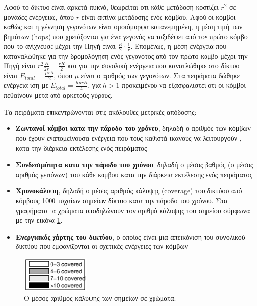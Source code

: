 Αφού το δίκτυο είναι αρκετά πυκνό, θεωρείται οτι κάθε μετάδοση κοστίζει $r^{2}$ σε μονάδες ενέργειας, όπου $r$ είναι ακτίνα μετάδοσης ενός κόμβου. Αφού οι κόμβοι
καθώς και η γέννηση γεγονότων είναι ομοιόμορφα κατανεμημένη, η μέση τιμή των βημάτων (hops) που χρειάζονται για ένα γεγονός να ταξιδέψει από τον πρώτο κόμβο που το
ανίχνευσε μέχρι την Πηγή είναι $\frac{R}{2}\cdot \frac{1}{r}$. Επομένως, η μέση ενέργεια που καταναλώθηκε για την δρομολόγηση ενός γεγονότος από τον πρώτο κόμβο μέχρι
την Πηγή είναι $r^2\frac{R}{2r} = \frac{rR}{2}$ και για την συνολική ενέργεια που κανατλώθηκε στο δίκτυο είναι $E_{total} = \frac{\mu r R}{2}$, όπου $\mu$ είναι ο
αριθμός των γεγονότων. Στα πειράματα δώθηκε ενέργεια ίση με $E_{total} = \frac{h\mu r R}{4}$, για $h > 1$ προκειμένου να εξασφαλιστεί οτι οι κόμβοι πεθαίνουν μετά
από αρκετούς γύρους.

Τα πειράματα επικεντρώνονται στις ακόλουθες μετρικές απόδοσης:
\begin{itemize}
\item \textbf{Ζωντανοί κόμβοι κατα την πάροδο του χρόνου}, δηλαδή ο αριθμός των κόμβων που έχουν εναπομείνουσα ενέργεια που τους καθιστά ικανούς να λειτουργούν , κατα
την διάρκεια εκτέλεσης ενός πειράματος
\item \textbf{Συνδεσιμότητα κατα την πάροδο του χρόνου}, δηλαδή ο μέσος βαθμός (ο μέσος αριθμός γειτόνων) του κάθε κόμβου κατα την διάρκεια εκτέλεσης ενός πειράματος
\item \textbf{Χρονοκάλυψη}, δηλαδή ο μέσος αριθμός κάλυψης (coverage) του δικτύου από κόμβους 1000 τυχαίων σημείων δίκτυο κατα την πάροδο του χρόνου. Στα γραφήματα τα
χρώματα υποδηλώνουν τον αριθμό κάλυψης του σημείου σύμφωνα με την εικόνα \ref{fig:coverage_sample}.
\item \textbf{Ενεργιακός χάρτης του δικτύου}, ο οποίος είναι μια απεικόνιση του συνολικού δικτύου που εμφανίζονται οι σχετικές ενέργειες των κόμβων
\end{itemize}

\begin{figure}[h]
  \centering
  \includegraphics[width=0.3\textwidth]{images/network_coverage.eps}
  \caption{Ο μέσος αριθμός κάλυψης των σημείων σε χρώματα.}
  \label{fig:coverage_sample}
\end{figure}

